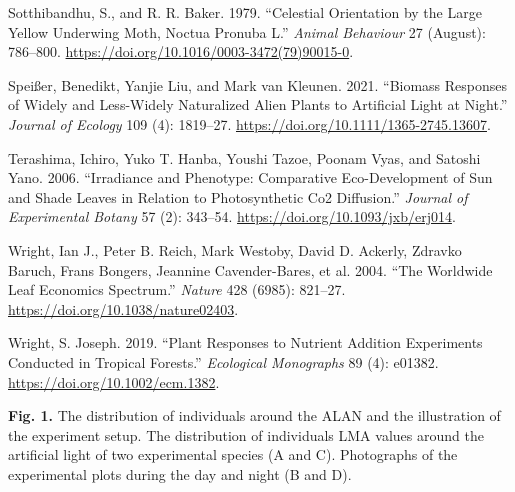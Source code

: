 \documentclass[
  letterpaper,
  DIV=11,
  numbers=noendperiod]{scrartcl}
\newlength{\cslhangindent}
\newlength{\cslentryspacingunit} %
\newenvironment{CSLReferences}[2] %
 {%
  \setlength{\parindent}{0pt}
  \ifodd #1
  \let\oldpar\par
  \def\par{\hangindent=\cslhangindent\oldpar}
  \fi
  \setlength{\parskip}{#2\cslentryspacingunit}
 }%
 {}
\begin{document}
\begin{CSLReferences}{1}{0}
\leavevmode{}%
Sotthibandhu, S., and R. R. Baker. 1979. {``Celestial Orientation by the
Large Yellow Underwing Moth, {Noctua} Pronuba {L}.''} \emph{Animal
Behaviour} 27 (August): 786--800.
\url{https://doi.org/10.1016/0003-3472(79)90015-0}.

\leavevmode{}%
Speißer, Benedikt, Yanjie Liu, and Mark van Kleunen. 2021. {``Biomass
Responses of Widely and Less-Widely Naturalized Alien Plants to
Artificial Light at Night.''} \emph{Journal of Ecology} 109 (4):
1819--27. \url{https://doi.org/10.1111/1365-2745.13607}.

\leavevmode{}%
Terashima, Ichiro, Yuko T. Hanba, Youshi Tazoe, Poonam Vyas, and Satoshi
Yano. 2006. {``Irradiance and Phenotype: Comparative Eco-Development of
Sun and Shade Leaves in Relation to Photosynthetic {Co2} Diffusion.''}
\emph{Journal of Experimental Botany} 57 (2): 343--54.
\url{https://doi.org/10.1093/jxb/erj014}.

\leavevmode{}%
Wright, Ian J., Peter B. Reich, Mark Westoby, David D. Ackerly, Zdravko
Baruch, Frans Bongers, Jeannine Cavender-Bares, et al. 2004. {``The
Worldwide Leaf Economics Spectrum.''} \emph{Nature} 428 (6985): 821--27.
\url{https://doi.org/10.1038/nature02403}.

\leavevmode{}%
Wright, S. Joseph. 2019. {``Plant Responses to Nutrient Addition
Experiments Conducted in Tropical Forests.''} \emph{Ecological
Monographs} 89 (4): e01382. \url{https://doi.org/10.1002/ecm.1382}.

\end{CSLReferences}

\newpage

\textbf{Fig. 1.} The distribution of individuals around the ALAN and the
illustration of the experiment setup. The distribution of individuals
LMA values around the artificial light of two experimental species (A
and C). Photographs of the experimental plots during the day and night
(B and D).
\end{document}
